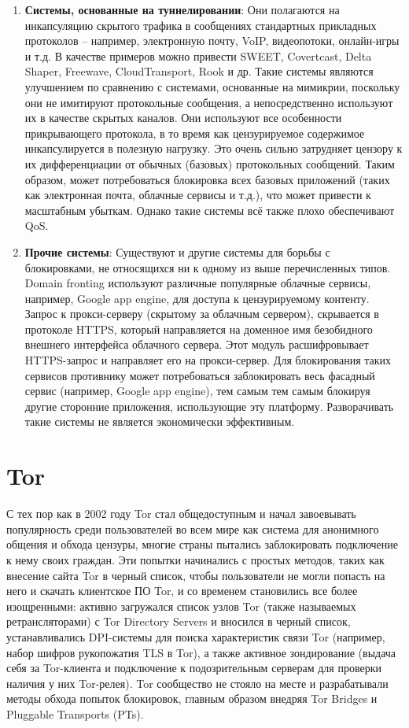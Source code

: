 \begin{enumerate}
    \item \textbf{Системы, основанные на туннелировании}:
    Они полагаются на инкапсуляцию скрытого трафика в сообщениях стандартных прикладных протоколов – например, электронную почту, VoIP, видеопотоки, онлайн-игры и т.д.
    В качестве примеров можно привести SWEET, Covertcast, Delta Shaper, Freewave, CloudTransport, Rook и др.
    Такие системы являются улучшением по сравнению с системами, основанные на мимикрии, поскольку они не имитируют протокольные сообщения,
    а непосредственно используют их в качестве скрытых каналов.
    Они используют все особенности прикрывающего протокола, в то время как цензурируемое содержимое инкапсулируется в полезную нагрузку.
    Это очень сильно затрудняет цензору к их дифференциации от обычных (базовых) протокольных сообщений.
    Таким образом, может потребоваться блокировка всех базовых приложений (таких как электронная почта, облачные сервисы и т.д.), что может привести к масштабным убыткам.
    Однако такие системы всё также плохо обеспечивают QoS.

    \item \textbf{Прочие системы}:
    Существуют и другие системы для борьбы с блокировками, не относящихся ни к одному из выше перечисленных типов.
    Domain fronting  используют различные популярные облачные сервисы, например, Google app engine, для доступа к цензурируемому контенту.
    Запрос к прокси-серверу (скрытому за облачным сервером), скрывается в протоколе HTTPS, который направляется на доменное имя безобидного внешнего интерфейса облачного сервера.
    Этот модуль расшифровывает HTTPS-запрос и направляет его на прокси-сервер.
    Для блокирования таких сервисов противнику может потребоваться заблокировать весь фасадный сервис (например, Google app engine), тем самым
    тем самым блокируя другие сторонние приложения, использующие эту платформу. Разворачивать такие системы не является экономически эффективным.


\end{enumerate}

\section{Tor}

С тех пор как в 2002 году Tor стал общедоступным и начал завоевывать популярность среди пользователей во всем мире как система для анонимного общения и обхода цензуры,
многие страны пытались заблокировать подключение к нему своих граждан. Эти попытки начинались с простых методов, таких как внесение сайта Tor в черный список,
чтобы пользователи не могли попасть на него и скачать клиентское ПО Tor, и со временем становились все более изощренными:
активно загружался список узлов Tor (также называемых ретрансляторами) с Tor Directory Servers и вносился в черный список,
устанавливались DPI-системы для поиска характеристик связи Tor (например, набор шифров рукопожатия TLS в Tor), а также активное зондирование
(выдача себя за Tor-клиента и подключение к подозрительным серверам для проверки наличия у них Tor-релея).
Tor сообщество не стояло на месте и разрабатывали методы обхода попыток блокировок, главным образом внедряя Tor Bridges и Pluggable Transports (PTs).

